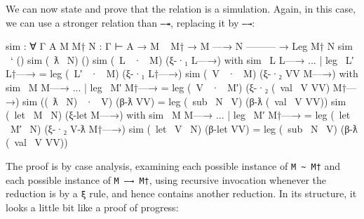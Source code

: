 We can now state and prove that the relation is a simulation. Again, in
this case, we can use a stronger relation than \texttt{—↠}, replacing it
by \texttt{—→}:

\begin{fence}
\begin{code}
sim : ∀ {Γ A} {M M† N : Γ ⊢ A}
  → M ~ M†
  → M —→ N
    ---------
  → Leg  M† N
sim ~`              ()
sim (~ƛ ~N)         ()
sim (~L ~· ~M)      (ξ-·₁ L—→)
  with sim ~L L—→
...  | leg ~L′ L†—→                 =  leg (~L′ ~· ~M)   (ξ-·₁ L†—→)
sim (~V ~· ~M)      (ξ-·₂ VV M—→)
  with sim ~M M—→
...  | leg ~M′ M†—→                 =  leg (~V ~· ~M′)   (ξ-·₂ (~val ~V VV) M†—→)
sim ((~ƛ ~N) ~· ~V) (β-ƛ VV)        =  leg (~sub ~N ~V)  (β-ƛ (~val ~V VV))
sim (~let ~M ~N)    (ξ-let M—→)
  with sim ~M M—→
...  | leg ~M′ M†—→                 =  leg (~let ~M′ ~N) (ξ-·₂ V-ƛ M†—→)
sim (~let ~V ~N)    (β-let VV)      =  leg (~sub ~N ~V)  (β-ƛ (~val ~V VV))
\end{code}
\end{fence}

The proof is by case analysis, examining each possible instance of
\texttt{M\ \textasciitilde{}\ M†} and each possible instance of
\texttt{M\ —→\ M†}, using recursive invocation whenever the reduction is
by a \texttt{ξ} rule, and hence contains another reduction. In its
structure, it looks a little bit like a proof of progress:

